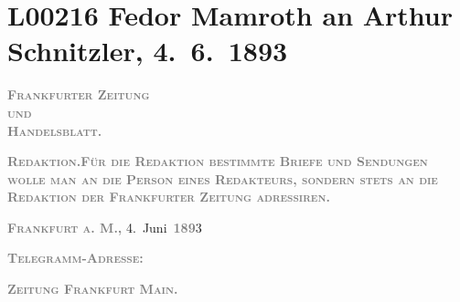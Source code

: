 

\section[Fedor Mamroth an Arthur Schnitzler, 4. 6. 1893]{L00216 Fedor Mamroth an Arthur Schnitzler, 4. 6. 1893}
\nopagebreak{}
\rehead{ }\normalsize\beginnumbering{}
\toendnotes[C]{\smallbreak\pagebreak[2]}
\toendnotes[C]{\smallbreak}
\pstart
           {\pb}\textcolor{gray}{\textbf{\textsc{Frankfurter Zeitung}}}{\\}\textsc{\textcolor{gray}{\textbf{und}}}{\\}\textcolor{gray}{\textbf{\textsc{Handelsblatt.}}}\pend
           
\pstart
           
\pstart
           \textcolor{gray}{\textbf{\textsc{Redaktion.\noindent{}\textcolor{gray}{\textbf{\textsc{Für die Redaktion bestimmte Briefe und
                                       Sendungen wolle man  an die
                                       Person eines Redakteurs, sondern stets \textbf{an die
                                          Redaktion der Frankfurter Zeitung} adressiren}}}.}}}\pend
           
\pstart
           \raggedleft{}\textcolor{gray}{\textbf{\textsc{Frankfurt a. M.,}}}{ }4. Juni \textsc{\textcolor{gray}{\textbf{189}}}3\pend
           \pend
           
\pstart
           \textcolor{gray}{\textbf{\textsc{Telegramm-Adresse:}}}\pend
           
\pstart
           \textcolor{gray}{\textbf{\textsc{Zeitung Frankfurt Main.}}}\pend
           
